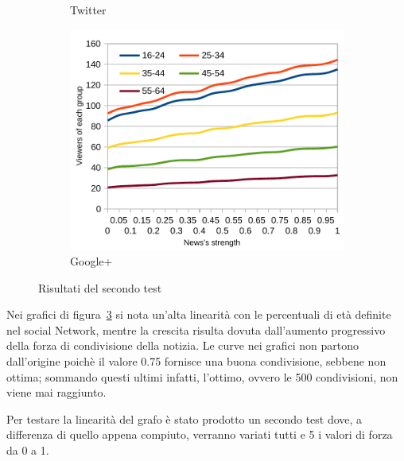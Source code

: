 \begin{figure}[!ht]
\begin{subfigure}[c]{0.32\textwidth}
\begin{center}
    \end{center}
    \vspace*{-10pt}
    \caption{Twitter}
    \label{img:result_test_2_tw_1}
  \end{subfigure}  
  \begin{subfigure}[r]{0.32\textwidth}
    \begin{center}
      \includegraphics[width=1\textwidth]{charts/second-test-gp_1.pdf}
    \end{center}
    \vspace*{-10pt}
    \caption{Google+}
    \label{img:result_test_2_gp_1}
  \end{subfigure}  
 \caption{Risultati del secondo test}
 \label{img:results_test_2_1}
\vspace*{-15pt}
\end{figure}

Nei grafici di figura~\ref{img:results_test_2_1} si nota un'alta linearità con le percentuali di età definite nel social Network, 
mentre la crescita risulta dovuta dall'aumento progressivo della forza di condivisione della notizia.
Le curve nei grafici non partono dall'origine poichè il valore 0.75 fornisce una buona condivisione, sebbene non ottima; 
sommando questi ultimi infatti, l'ottimo, ovvero le 500 condivisioni, non viene mai raggiunto.

Per testare la linearità del grafo è stato prodotto un secondo test dove, a differenza di quello appena compiuto,
verranno variati tutti e 5 i valori di forza da 0 a 1.


